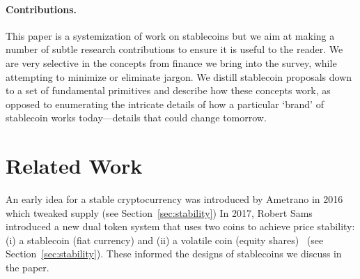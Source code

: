 \paragraph{Contributions.} This paper is a systemization of work on stablecoins but we aim at making a number of subtle research contributions to ensure it is useful to the reader. We are very selective in the concepts from finance we bring into the survey, while attempting to minimize or eliminate jargon. We distill stablecoin proposals down to a set of fundamental primitives and describe how these concepts work, as opposed to enumerating the intricate details of how a particular `brand' of stablecoin works today---details that could change tomorrow. %



\section{Related Work}
\label{sec:lit}

An early idea for a stable cryptocurrency was introduced by Ametrano in 2016~\cite{ametrano2016hayek} which tweaked supply (see Section~\ref{sec:stability}) In 2017, Robert Sams introduced a new dual token system that uses two coins to achieve price stability: (i) a stablecoin (\eg fiat currency) and (ii) a volatile coin (\eg equity shares)~\cite{sams2015note} (see Section~\ref{sec:stability}). These informed the designs of stablecoins we discuss in the paper.


